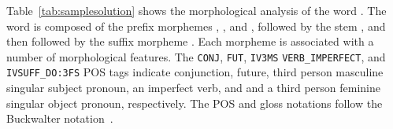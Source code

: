 Table~\ref{tab:samplesolution} shows the morphological analysis
of the word . 
The word is composed of the prefix morphemes 
, , and , followed by the 
stem , and then followed by the suffix morpheme
. 
Each morpheme is associated with a number of morphological features.
The {\tt CONJ},
{\tt FUT}, 
{\tt IV3MS} 
{\tt VERB\_IMPERFECT}, and 
{\tt IVSUFF\_DO:3FS} POS tags indicate
conjunction, 
future, 
third person masculine singular subject pronoun,
an imperfect verb, and 
and a third person feminine singular object pronoun, respectively.
The POS and gloss notations follow the Buckwalter notation~\cite{Buckwalter:02}.